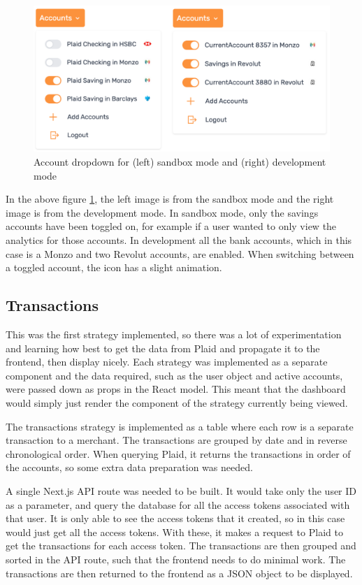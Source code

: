 \begin{figure}[H]
	\centering
	\includegraphics[width=\textwidth]{images/Accounts_dropdown.png}
	\caption{Account dropdown for (left) sandbox mode and (right) development mode}
	\label{fig:AccountsDropdown}
\end{figure}

In the above figure \ref{fig:AccountsDropdown}, the left image is from the sandbox mode and the right image is from the development mode. In sandbox mode, only the savings accounts have been toggled on, for example if a user wanted to only view the analytics for those accounts. In development all the bank accounts, which in this case is a Monzo and two Revolut accounts, are enabled. When switching between a toggled account, the icon has a slight animation.

\subsection{Transactions}
This was the first strategy implemented, so there was a lot of experimentation and learning how best to get the data from Plaid and propagate it to the frontend, then display nicely. Each strategy was implemented as a separate component and the data required, such as the user object and active accounts, were passed down as props in the React model. This meant that the dashboard would simply just render the component of the strategy currently being viewed.

The transactions strategy is implemented as a table where each row is a separate transaction to a merchant. The transactions are grouped by date and in reverse chronological order. When querying Plaid, it returns the transactions in order of the accounts, so some extra data preparation was needed.

A single Next.js API route was needed to be built. It would take only the user ID as a parameter, and query the database for all the access tokens associated with that user. It is only able to see the access tokens that it created, so in this case would just get all the access tokens. With these, it makes a request to Plaid to get the transactions for each access token. The transactions are then grouped and sorted in the API route, such that the frontend needs to do minimal work. The transactions are then returned to the frontend as a JSON object to be displayed.

